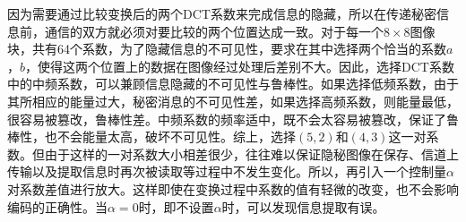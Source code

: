 \documentclass[11pt]{article}
\begin{document}
    因为需要通过比较变换后的两个DCT系数来完成信息的隐藏，所以在传递秘密信息前，通信的双方就必须对要比较的两个位置达成一致。对于每一个\(8\times8\)图像块，共有64个系数，为了隐藏信息的不可见性，要求在其中选择两个恰当的系数\(a\)，\(b\)，使得这两个位置上的数据在图像经过处理后差别不大。因此，选择DCT系数中的中频系数，可以兼顾信息隐藏的不可见性与鲁棒性。如果选择低频系数，由于其所相应的能量过大，秘密消息的不可见性差，如果选择高频系数，则能量最低，很容易被篡改，鲁棒性差。中频系数的频率适中，既不会太容易被篡改，保证了鲁棒性，也不会能量太高，破坏不可见性。综上，选择\((5,2)\)和\((4,3)\)这一对系数。但由于这样的一对系数大小相差很少，往往难以保证隐秘图像在保存、信道上传输以及提取信息时再次被读取等过程中不发生变化。所以，再引入一个控制量\(\alpha\)对系数差值进行放大。这样即使在变换过程中系数的值有轻微的改变，也不会影响编码的正确性。当$\alpha=0$时，即不设置$\alpha$时，可以发现信息提取有误。
\end{document}
